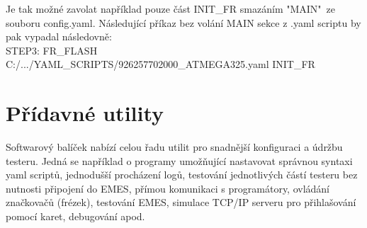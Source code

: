 Je tak možné zavolat například pouze část INIT\_FR smazáním "MAIN"\ ze souboru config.yaml.
Následující příkaz bez volání MAIN sekce z .yaml scriptu by pak vypadal následovně:\\
STEP3: FR\_FLASH C:/.../YAML\_SCRIPTS/926257702000\_ATMEGA325.yaml INIT\_FR

\section{Přídavné utility}
 Softwarový balíček nabízí celou řadu utilit pro snadnější konfiguraci a údržbu testeru.
 Jedná se například o programy umožňující nastavovat správnou syntaxi yaml scriptů, jednodušší procházení logů,
 testování jednotlivých částí testeru bez nutnosti připojení do EMES, přímou komunikaci s programátory,
 ovládání značkovačů (frézek), testování EMES, simulace TCP/IP serveru pro přihlašování pomocí karet, debugování apod.

